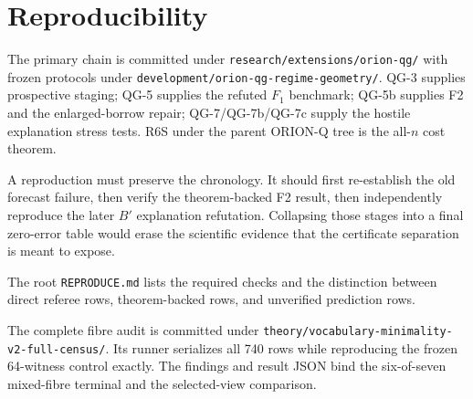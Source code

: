 \section{Reproducibility}

The primary chain is committed under \texttt{research/extensions/orion-qg/} with frozen protocols under \texttt{development/orion-qg-regime-geometry/}. QG-3 supplies prospective staging; QG-5 supplies the refuted $F_1$ benchmark; QG-5b supplies F2 and the enlarged-borrow repair; QG-7/QG-7b/QG-7c supply the hostile explanation stress tests. R6S under the parent ORION-Q tree is the all-$n$ cost theorem.

A reproduction must preserve the chronology. It should first re-establish the old forecast failure, then verify the theorem-backed F2 result, then independently reproduce the later $B'$ explanation refutation. Collapsing those stages into a final zero-error table would erase the scientific evidence that the certificate separation is meant to expose.

The root \texttt{REPRODUCE.md} lists the required checks and the distinction between direct referee rows, theorem-backed rows, and unverified prediction rows.

The complete fibre audit is committed under
\texttt{theory/\allowbreak vocabulary-\allowbreak minimality-\allowbreak
v2-\allowbreak full-\allowbreak census/}. Its runner serializes all
740 rows while reproducing the frozen 64-witness control exactly. The findings
and result JSON bind the six-of-seven mixed-fibre terminal and the selected-view
comparison.
